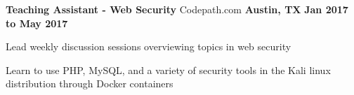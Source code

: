 \begin{cventries}
	\cventry
		{\normalsize \textbf{Teaching Assistant - Web Security}}
		{\large Codepath.com}
		{\normalsize \textbf{Austin, TX}}
		{\normalsize \textbf{Jan 2017 to May 2017}}
		{
			\begin{cvitems}
				\item {\normalsize Lead weekly discussion sessions overviewing topics in web security}
                \item {\normalsize Learn to use PHP, MySQL, and a variety of security tools in the Kali linux distribution through Docker containers} 
			\end{cvitems}
		}
\end{cventries}
